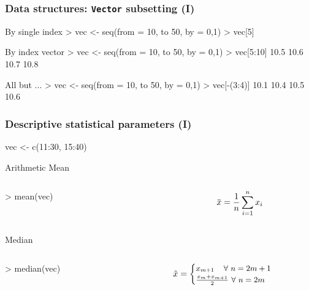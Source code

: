 \documentclass[ucs]{beamer}
\newcommand{\overbar}[1]{\mkern 1.5mu\overline{\mkern-1.5mu#1\mkern-1.5mu}\mkern 1.5mu}
\begin{document}
\begin{frame}
  \frametitle{Data structures: \texttt{Vector} subsetting (I)}
  
  \begin{block}{By single index}
    \ttfamily
    > vec <- seq(from = 10, to 50, by = 0,1)\newline
    > vec[5] \newline
    [1] 
  \end{block}
  
  \begin{block}{By index vector}  
    \ttfamily
    > vec <- seq(from = 10, to 50, by = 0,1)\newline
    > vec[5:10] 10.5 10.6 10.7 10.8
  \end{block}
  
  \begin{block}{All but ...}
    \ttfamily
    > vec <- seq(from = 10, to 50, by = 0,1)\newline
    > vec[-(3:4)]  10.1 10.4 10.5 10.6
  \end{block}
  
\end{frame}





\begin{frame}
  \frametitle{Descriptive statistical parameters (I)}

  \ttfamily vec <- c(11:30, 15:40)
  \begin{block}{Arithmetic Mean}
    \begin{columns}
      \begin{column}{0.6\textwidth}       
    \ttfamily > mean(vec)
      \end{column}
          \begin{column}{0.4\textwidth}
\[ 
\overbar{x} = \frac{1}{n}\sum_{i=1}^{n}{x_i}
\] 
      \end{column}
  \end{columns}
  \end{block}

\begin{block}{Median}
  \begin{columns}
    \begin{column}{0.5\textwidth}       
      \ttfamily > median(vec)
    \end{column}
    \begin{column}{0.5\textwidth} \[ \tilde{x} =
      \small \begin{cases}
   x_{m+1}  ~~~\, \forall ~n = 2m + 1   \\
   \frac{ x_m + x_{m+1} }{2} ~ \forall~ n = 2m  
   \end{cases}   
      \] 
    \end{column}
  \end{columns}
\end{block}
\end{frame}
\end{document}

